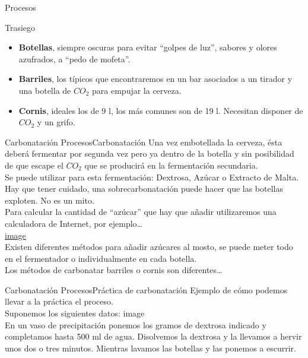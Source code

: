 \begin{frame}[fragile]{Procesos}
\begin{block}{Trasiego}
\begin{itemize}
\item
  \textbf{Botellas}, siempre oscuras para evitar ``golpes de luz'',
  sabores y olores azufrados, a ``pedo de mofeta''.
\item
  \textbf{Barriles}, los típicos que encontraremos en un bar asociados a
  un tirador y una botella de \(CO_2\) para empujar la cerveza.
\item
  \textbf{Cornis}, ideales los de 9 l, los más comunes son de 19 l.
  Necesitan disponer de \(CO_2\) y un grifo.
\end{itemize}
\end{block}

\begin{block}{Carbonatación}
\protect\hypertarget{carbonataciuxf3n}{}
ProcesosCarbonatación Una vez embotellada la cerveza, ésta deberá
fermentar por segunda vez pero ya dentro de la botella y sin posibilidad
de que escape el \(CO_2\) que se producirá en la fermentación
secundaria.\\
Se puede utilizar para esta fermentación: Dextrosa, Azúcar o Extracto de
Malta.\\
Hay que tener cuidado, una sobrecarbonatación puede hacer que las
botellas exploten. No es un mito.\\
Para calcular la cantidad de ``azúcar'' que hay que añadir utilizaremos
una calculadora de Internet, por ejemplo\ldots{}\\
\href{http://www.cerveceros-caseros.com/index.php/calculadora-acce/carbonatacion}{{image}}\\
Existen diferentes métodos para añadir azúcares al mosto, se puede meter
todo en el fermentador o individualmente en cada botella.\\
Los métodos de carbonatar barriles o cornis son diferentes\ldots{}
\end{block}

\begin{block}{Carbonatación}
\protect\hypertarget{carbonataciuxf3n-1}{}
ProcesosPráctica de carbonatación Ejemplo de cómo podemos llevar a la
práctica el proceso.\\
Suponemos los siguientes datos: {image}\\
En un vaso de precipitación ponemos los gramos de dextrosa indicado y
completamos hasta 500 ml de agua. Disolvemos la dextrosa y la llevamos a
hervir unos dos o tres minutos. Mientras lavamos las botellas y las
ponemos a escurrir.\\


\end{block}
\end{frame}
